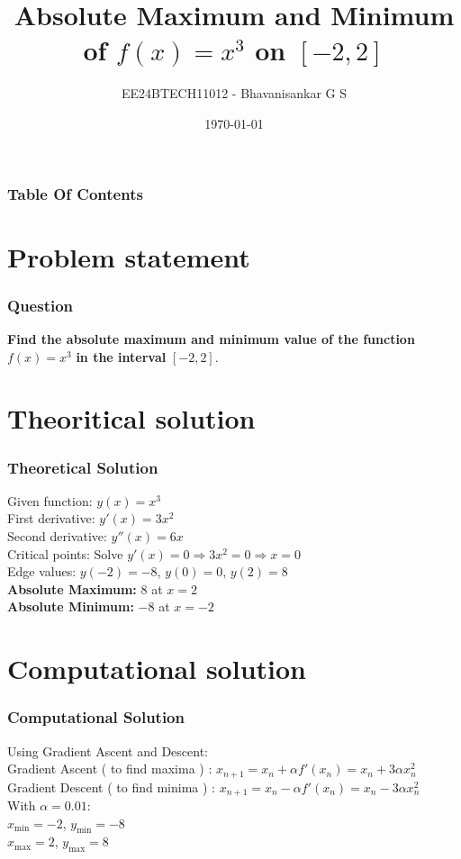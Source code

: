 \documentclass{beamer}
\title{Absolute Maximum and Minimum of $f(x) = x^3$ on $[-2, 2]$}
\author{EE24BTECH11012 - Bhavanisankar G S}
\date{\today}
\begin{document}
\frame{\titlepage}

\begin{frame}
\frametitle{Table Of Contents}
\tableofcontents
\end{frame}

\section{Problem statement}
\begin{frame}
\frametitle{Question}
\textbf{Find the absolute maximum and minimum value of the function} $f(x) = x^3$ \textbf{in the interval} $[-2, 2]$.
\end{frame}

\section{Theoritical solution}
\begin{frame}
\frametitle{Theoretical Solution}
Given function: $y(x) = x^3$ \\[0.2cm]
First derivative: $y'(x) = 3x^2$ \\[0.2cm]
Second derivative: $y''(x) = 6x$ \\[0.2cm]
Critical points: Solve $y'(x) = 0 \Rightarrow 3x^2 = 0 \Rightarrow x = 0$ \\[0.2cm]
Edge values: $y(-2) = -8$, $y(0) = 0$, $y(2) = 8$ \\[0.2cm]
\textbf{Absolute Maximum:} $8$ at $x=2$ \\
\textbf{Absolute Minimum:} $-8$ at $x=-2$
\end{frame}

\section{Computational solution}
\begin{frame}
\frametitle{Computational Solution}
Using Gradient Ascent and Descent: \\[0.2cm]
Gradient Ascent ( to find maxima ) : $x_{n+1} = x_n + \alpha f'(x_n) = x_n + 3\alpha x_n^2$ \\[0.2cm]
Gradient Descent ( to find minima ) : $x_{n+1} = x_n - \alpha f'(x_n) = x_n - 3\alpha x_n^2$ \\[0.2cm]
With $\alpha = 0.01$: \\
$x_{\text{min}} = -2$, $y_{\text{min}} = -8$ \\
$x_{\text{max}} = 2$, $y_{\text{max}} = 8$
\end{frame}
\end{document}
